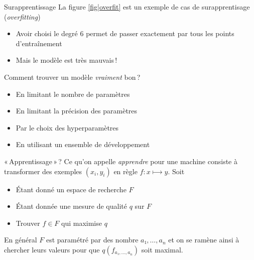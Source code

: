 \documentclass[../allslides.tex]{subfiles}
\begin{document}
\begin{frame}{Surapprentissage}
    La figure \ref{fig|overfit} est un exemple de cas de \alert{surapprentisage} (\emph{overfitting})
    \begin{itemize}
        \item Avoir choisi le degré \num{6} permet de passer exactement par tous les points d'entraînement
        \item Mais le modèle est très mauvais !
    \end{itemize}
    Comment trouver un modèle \emph{vraiment} bon ?
    \begin{itemize}
        \item En limitant le nombre de paramètres
        \item En limitant la précision des paramètres
        \item Par le choix des hyperparamètres
        \item En utilisant un ensemble de développement
    \end{itemize}
\end{frame}

\begin{frame}{« Apprentissage » ?}
    Ce qu'on appelle \emph{apprendre} pour une machine consiste à transformer des exemples \((x_i, y_i)\) en règle \(f: x⟼y\). Soit
    \begin{itemize}
        \item Étant donné un espace de recherche \(F\)
        \item Étant donnée une mesure de qualité \(q\) sur \(F\)
        \item Trouver \(f∈F\) qui maximise \(q\)
    \end{itemize}
    En général \(F\) est paramétré par des nombre \(a₁,…,a_n\) et on se ramène ainsi à chercher leurs valeurs pour que \(q(f_{a₁,…,a_n})\) soit maximal.
\end{frame}
\end{document}
